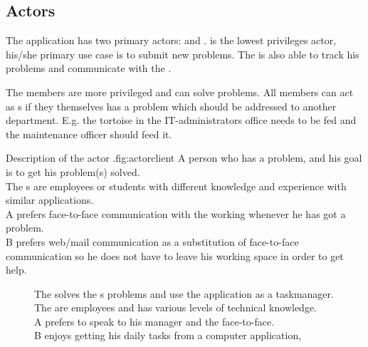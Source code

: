\subsection{Actors}
\label{sec:actors}

The application has two primary actors:  \aclient{} and \astaff. \aclient[c] is the lowest privileges actor, his/she primary use case is to submit new problems. The \aclient[] is also able to track his problems and communicate with the \astaff[]. 

The \astaff{} members are more privileged and can solve problems. 
All \astaff{} members can act as \aclient{}s if they themselves has a problem which should be addressed to another department. 
E.g. the tortoise in the IT-administrators office needs to be fed and the maintenance officer should feed it. 


\begin{sadlist}[h]{\Aclient}{Description of the actor \aclient.}{fig:actorclient}
 A person who has a problem, and his goal is to get his problem(s) solved. \\
 The \aclient{}s are employees or students with different knowledge and experience with similar applications. \\%
 \Aclient{} A prefers face-to-face communication with the working \astaff{} whenever he has got a problem.\\
\aclient[c] B prefers web/mail communication as a substitution of face-to-face communication so he does not have to leave his working space in order to get help. 
\end{sadlist} 

\begin{figure}[H]
\begin{sadlistar}{\Astaff}
 The \astaff{} solves the \aclient[]s problems and use the application as a taskmanager.  \\
 The \astaff[] are employees and has various levels of technical knowledge. \\
 \astaff[c] A prefers to speak to his manager and the \aclient[] face-to-face.\\
\astaff[c] B enjoys getting his daily tasks from a computer application, 
 \end{sadlistar}
 \caption{}
 \label{fig:actorstaff}
 \end{figure}


